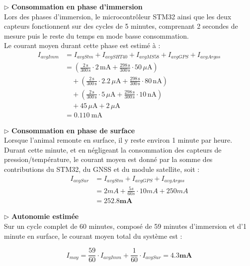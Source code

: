 \documentclass[12pt]{article}
\begin{document}
$\triangleright$ \textbf{Consommation en phase d’immersion} \\

\noindent Lors des phases d’immersion, le microcontrôleur STM32 ainsi que les deux capteurs fonctionnent sur des cycles de 5 minutes, comprenant 2 secondes de mesure puis le reste du temps en mode basse consommation. \\
Le courant moyen durant cette phase est estimé à :
\begin{align*}
I_{avgImm}
    &= I_{avgStm} + I_{avgSHT40} + I_{avgMS58} + I_{avgGPS} + I_{avgArgos} \\
    &= \left(\frac{2\,\mathrm{s}}{300\,\mathrm{s}} \cdot 2\,\mathrm{mA}
       + \frac{298\,\mathrm{s}}{300\,\mathrm{s}} \cdot 50\,\mu\mathrm{A}\right) \nonumber\\
    &\quad + \left(\frac{2\,\mathrm{s}}{300\,\mathrm{s}} \cdot 2.2\,\mu\mathrm{A}
       + \frac{298\,\mathrm{s}}{300\,\mathrm{s}} \cdot 80\,\mathrm{nA}\right) \nonumber\\
    &\quad + \left(\frac{2\,\mathrm{s}}{300\,\mathrm{s}} \cdot 5\,\mu\mathrm{A}
       + \frac{298\,\mathrm{s}}{300\,\mathrm{s}} \cdot 10\,\mathrm{nA}\right) \nonumber\\
    &\quad + 45\,\mu\mathrm{A} + 2\,\mu\mathrm{A} \\
    &= \mathbf{0.110\ \mathrm{mA}}
\end{align*}

$\triangleright$ \textbf{Consommation en phase de surface} \\

\noindent Lorsque l’animal remonte en surface, il y reste environ 1 minute par heure. Durant cette minute, et en négligeant la consommation des capteurs de pression/température, le courant moyen est donné par la somme des contributions du STM32, du GNSS et du module satellite, soit :
\begin{align*}
I_{avgSur} &= I_{avgStm} + I_{avgGPS} + I_{avgArgos} \\
	   &= 2mA + \frac{5s}{60s} \cdot 10mA + 250mA \\ 
	   &= \bm{252.8 mA}
\end{align*}

$\triangleright$ \textbf{Autonomie estimée} \\

\noindent Sur un cycle complet de 60 minutes, composé de 59 minutes d’immersion et d’1 minute en surface, le courant moyen total du système est :

\begin{equation}
	I_{moy} = \frac{59}{60} \cdot I_{avgImm} + \frac{1}{60} \cdot I_{avgSur} = \bm{4.3mA}
\end{equation}
\end{document}
